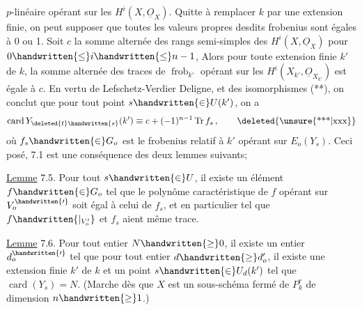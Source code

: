 $p$-linéaire opérant sur les $H^i(X,\underline{O}_X)$. Quitte à remplacer $k$ par une extension finie, on peut supposer que toutes les valeurs propres desdits frobenius sont égales à 0 ou 1. Soit $c$ la somme alternée  des rangs semi-simples des $H^i(X,\underline{O}_X)$ pour $0\handwritten{\leq}i\handwritten{\leq}n-1$, Alors pour toute extension finie $k'$ de $k$, la somme alternée des traces de $\operatorname{frob}_{k'}$ opérant sur les $H^i(X_{k'},\underline{O}_{X_{k'}})$ est  égale à $c$. En vertu de Lefschetz-Verdier Deligne, et des isomorphismes (**), on conclut que pour tout point $s\handwritten{\in}U(k')$, on a
\[
\operatorname{card}Y_{\deleted{t}\handwritten{s}}(k')\equiv c+(-1)^{n-1}\operatorname{Tr}f_s\,,
\tag*{\deleted{\unsure{***|xxx}}}
\]
où $f_s\handwritten{\in}G_o$ est  le frobenius relatif à $k'$ opérant sur $E_o(Y_s)$. Ceci posé, 7.1 est une conséquence des deux lemmes suivants;

\uline{Lemme} 7.5. Pour tout $s\handwritten{\in}U$, il existe un élément $f\handwritten{\in}G_o$  tel que le polynôme caractéristique de $f$ opérant sur $V_o^{\handwritten{\prime}}$ soit égal à celui de $f_s$, et en particulier tel que $f\handwritten{|_{V'_o}}$ et $f_s$ aient même trace.

\uline{Lemme} 7.6. Pour tout entier $N\handwritten{\geq}0$, il existe un entier $d^{\handwritten{\prime}}_o$  tel que pour tout entier $d\handwritten{\geq}d'_o$, il existe une extension finie $k'$ de $k$ et un point $s\handwritten{\in}U_d(k')$ tel que $\operatorname{card}(Y_s)=N$. (Marche dès que $X$ est un sous-schéma fermé de $P^r_k$ de dimension $n\handwritten{\geq}1$.)

